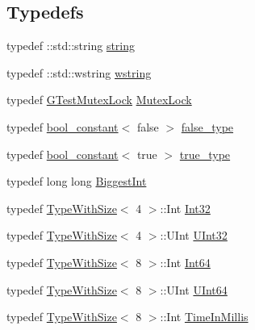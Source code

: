 \subsection*{\-Typedefs}
\begin{DoxyCompactItemize}
\item 
typedef \-::std\-::string \hyperlink{namespacetesting_1_1internal_a9882e571372fc19a02d2b2949e1f1557}{string}
\item 
typedef \-::std\-::wstring \hyperlink{namespacetesting_1_1internal_a393885eea6349a55ca3640cccbe912a6}{wstring}
\item 
typedef \hyperlink{classtesting_1_1internal_1_1GTestMutexLock}{\-G\-Test\-Mutex\-Lock} \hyperlink{namespacetesting_1_1internal_a0ceb93bd27638edfa3ced2469951fd99}{\-Mutex\-Lock}
\item 
typedef \hyperlink{structtesting_1_1internal_1_1bool__constant}{bool\-\_\-constant}$<$ false $>$ \hyperlink{namespacetesting_1_1internal_a6fd572a03d56d5b60cf459268a055e4c}{false\-\_\-type}
\item 
typedef \hyperlink{structtesting_1_1internal_1_1bool__constant}{bool\-\_\-constant}$<$ true $>$ \hyperlink{namespacetesting_1_1internal_a6f18ab9cf27798886d6a0f222dc004bc}{true\-\_\-type}
\item 
typedef long long \hyperlink{namespacetesting_1_1internal_ae8f73370150f905887720532fa9f572e}{\-Biggest\-Int}
\item 
typedef \hyperlink{classtesting_1_1internal_1_1TypeWithSize}{\-Type\-With\-Size}$<$ 4 $>$\-::\-Int \hyperlink{namespacetesting_1_1internal_a8d84339888eecdb29b3d8f7607af3ecc}{\-Int32}
\item 
typedef \hyperlink{classtesting_1_1internal_1_1TypeWithSize}{\-Type\-With\-Size}$<$ 4 $>$\-::\-U\-Int \hyperlink{namespacetesting_1_1internal_a03df445d5850459574de6ffb6f57ae95}{\-U\-Int32}
\item 
typedef \hyperlink{classtesting_1_1internal_1_1TypeWithSize}{\-Type\-With\-Size}$<$ 8 $>$\-::\-Int \hyperlink{namespacetesting_1_1internal_af808a02f2629fbe7daf70b8bded220f6}{\-Int64}
\item 
typedef \hyperlink{classtesting_1_1internal_1_1TypeWithSize}{\-Type\-With\-Size}$<$ 8 $>$\-::\-U\-Int \hyperlink{namespacetesting_1_1internal_ad44e156098a845911b5d4788b9512930}{\-U\-Int64}
\item 
typedef \hyperlink{classtesting_1_1internal_1_1TypeWithSize}{\-Type\-With\-Size}$<$ 8 $>$\-::\-Int \hyperlink{namespacetesting_1_1internal_a9e0fb32f592d143f031a3431366adae0}{\-Time\-In\-Millis}
\item 

\end{DoxyCompactItemize}
